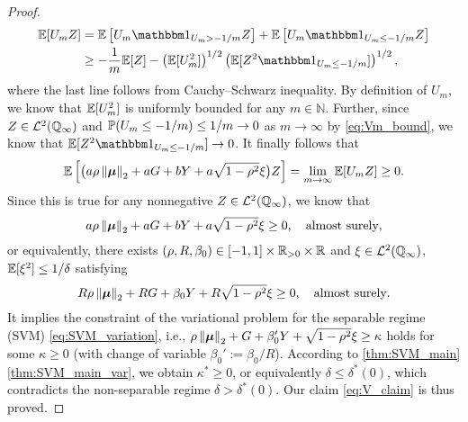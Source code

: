 \begin{proof}
\begin{align*}
        \E [U_m Z] & =  \E \left[ U_m \ind_{U_m > - 1/m} Z \right] + \E \left[ U_m \ind_{U_m \le - 1/m} Z \right] 
        \\ 
        & \ge - \frac{1}{m} \E [Z] - \left( \E[ U_m^2 ] \right)^{1/2}  \left(\E[ Z^2 \ind_{U_m \le - 1/m}] \right)^{1/2},
    \end{align*}
    where the last line follows from Cauchy--Schwarz inequality. By definition of $U_m$, we know that $\E [U_m^2]$ is uniformly bounded for any $m \in \mathbb{N}$. Further, since $Z \in \cL^2 (\Q_\infty)$ and $\P (U_m \le -1/m) \le 1/m \to 0$ as $m \to \infty$ by \cref{eq:Vm_bound}, we know that $\E [Z^2 \ind_{U_m \le - 1/m}] \to 0$. It finally follows that
    \begin{equation*}
        \E \left[ \bigl( a \rho \norm{\bmu}_2 + a G + b Y + a \sqrt{1 - \rho^2} \xi \bigr) Z \right] 
        = \lim_{m \to \infty} \E [U_m Z] \ge 0.
    \end{equation*}
    Since this is true for any nonnegative $Z \in \cL^2 (\Q_\infty)$, we know that
    \begin{equation*}
        a \rho \norm{\bmu}_2 + a G + b Y + a \sqrt{1 - \rho^2} \xi \ge 0, \quad \text{almost surely},
    \end{equation*}
    or equivalently, there exists $(\rho, R, \beta_0) \in [-1, 1] \times \R_{>0} \times \R$ and $\xi \in \cL^2 (\Q_\infty)$, $\E[\xi^2] \le 1/\delta$ satisfying
    \begin{equation*}
        R \rho \norm{\bmu}_2 + R G + \beta_0 Y + R \sqrt{1 - \rho^2} \xi \ge 0, \quad \text{almost surely}.
    \end{equation*}
    It implies the constraint of the variational problem for the separable regime (SVM) \cref{eq:SVM_variation}, i.e., $\rho \norm{\bmu}_2 + G + \beta_0' Y + \sqrt{1 - \rho^2} \xi \ge \kappa$ holds for some $\kappa \ge 0$ (with change of variable $\beta_0' := \beta_0 / R$). According to \cref{thm:SVM_main}\ref{thm:SVM_main_var}, we obtain $\kappa^* \ge 0$, or equivalently $\delta \le \delta^*(0)$, which contradicts the non-separable regime $\delta > \delta^* (0)$. Our claim \cref{eq:V_claim} is thus proved. 
    

\end{proof}
